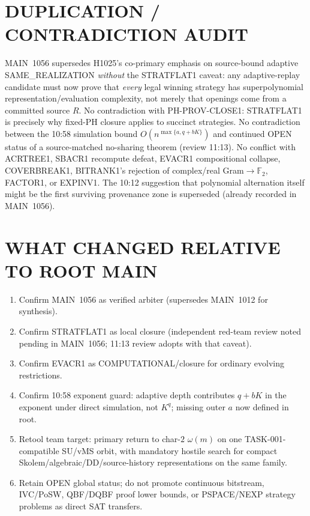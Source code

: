 \documentclass[11pt]{article}
\begin{document}
\section*{DUPLICATION / CONTRADICTION AUDIT}
MAIN~1056 supersedes H1025's co-primary emphasis on source-bound adaptive SAME\_REALIZATION
\emph{without} the STRATFLAT1 caveat: any adaptive-replay candidate must now prove that
\emph{every} legal winning strategy has superpolynomial representation/evaluation complexity,
not merely that openings come from a committed source $R$.
No contradiction with PH-PROV-CLOSE1: STRATFLAT1 is precisely why fixed-PH closure applies to
succinct strategies.
No contradiction between the 10:58 simulation bound $O(n^{\max\{a,q+bK\}})$ and continued OPEN
status of a source-matched no-sharing theorem (review 11:13).
No conflict with ACRTREE1, SBACR1 recompute defeat, EVACR1 compositional collapse, COVERBREAK1,
BITRANK1's rejection of complex/real Gram$\to\mathbb F_2$, FACTOR1, or EXPINV1.
The 10:12 suggestion that polynomial alternation itself might be the first surviving provenance
zone is superseded (already recorded in MAIN~1056).

\section*{WHAT CHANGED RELATIVE TO ROOT MAIN}
\begin{enumerate}
\item Confirm MAIN~1056 as verified arbiter (supersedes MAIN~1012 for synthesis).
\item Confirm STRATFLAT1 as local closure (independent red-team review noted pending in MAIN~1056;
11:13 review adopts with that caveat).
\item Confirm EVACR1 as COMPUTATIONAL/closure for ordinary evolving restrictions.
\item Confirm 10:58 exponent guard: adaptive depth contributes $q+bK$ in the exponent under
direct simulation, not $K^q$; missing outer $a$ now defined in root.
\item Retool team target: primary return to char-$2$ $\omega(m)$ on one TASK-001-compatible
SU/vMS orbit, with mandatory hostile search for compact Skolem/algebraic/DD/source-history
representations on the same family.
\item Retain OPEN global status; do not promote continuous bitstream, IVC/PoSW, QBF/DQBF proof
lower bounds, or PSPACE/NEXP strategy problems as direct SAT transfers.
\end{enumerate}
\end{document}

